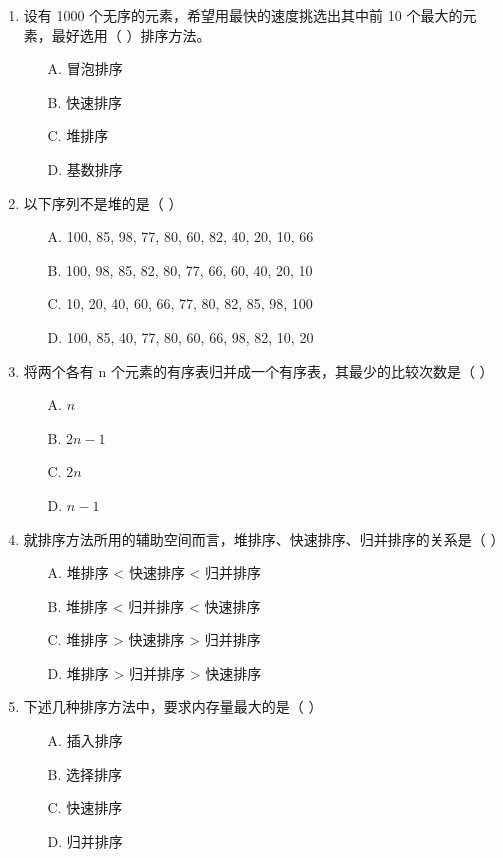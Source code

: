 \documentclass[12pt, a4paper]{article}
\begin{document}
\begin{enumerate}[label=\arabic*.]
	\item 设有 1000 个无序的元素，希望用最快的速度挑选出其中前 10 个最大的元素，最好选用（ ）排序方法。
	      \begin{enumerate}
		      \item[A.] 冒泡排序
		      \item[B.] 快速排序
		      \item[C.] 堆排序
		      \item[D.] 基数排序
	      \end{enumerate}

	\item 以下序列不是堆的是（ ）
	      \begin{enumerate}
		      \item[A.] 100, 85, 98, 77, 80, 60, 82, 40, 20, 10, 66
		      \item[B.] 100, 98, 85, 82, 80, 77, 66, 60, 40, 20, 10
		      \item[C.] 10, 20, 40, 60, 66, 77, 80, 82, 85, 98, 100
		      \item[D.] 100, 85, 40, 77, 80, 60, 66, 98, 82, 10, 20
	      \end{enumerate}

	\item 将两个各有 n 个元素的有序表归并成一个有序表，其最少的比较次数是（ ）
	      \begin{enumerate}
		      \item[A.] $n$
		      \item[B.] $2n-1$
		      \item[C.] $2n$
		      \item[D.] $n-1$
	      \end{enumerate}

	\item 就排序方法所用的辅助空间而言，堆排序、快速排序、归并排序的关系是（ ）
	      \begin{enumerate}
		      \item[A.] 堆排序 < 快速排序 < 归并排序
		      \item[B.] 堆排序 < 归并排序 < 快速排序
		      \item[C.] 堆排序 > 快速排序 > 归并排序
		      \item[D.] 堆排序 > 归并排序 > 快速排序
	      \end{enumerate}

	\item 下述几种排序方法中，要求内存量最大的是（ ）
	      \begin{enumerate}
		      \item[A.] 插入排序
		      \item[B.] 选择排序
		      \item[C.] 快速排序
		      \item[D.] 归并排序
	      \end{enumerate}


\end{enumerate}
\end{document}
